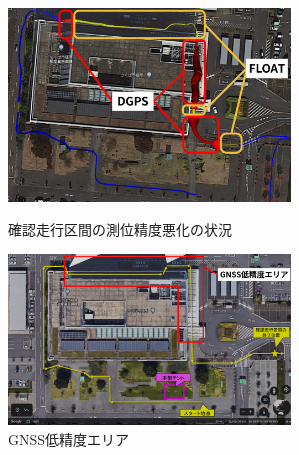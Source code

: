 \documentclass[platex,dvipdfmx]{rbproceedings}
\begin{document}
%
%
\begin{figure}[tbh]
   \centering
   \begin{minipage}[b]{.45\linewidth}
       \centering   
       \includegraphics[keepaspectratio,width=75mm]{fig/cityhall_fix.png}
       \caption{確認走行区間の測位精度悪化の状況}
       \label{fig:cityhall_fix}
   \end{minipage}
   \begin{minipage}[b]{.45\linewidth}
       \centering
       \includegraphics[keepaspectratio,width=75mm]{fig/weak_gnss_area.png}
       \caption{GNSS低精度エリア}
       \label{fig:no_gnss_area}
   \end{minipage}
\end{figure}
\end{document}
